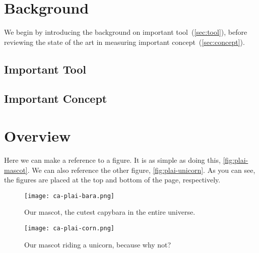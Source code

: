 \documentclass[thesis]{plai}
\begin{document}
\chapter{Background}
\label{chapter:background}

We begin by introducing the background on important tool~(\autoref{sec:tool}), before reviewing the state of the art in measuring important concept~(\autoref{sec:concept}).

\section{Important Tool}
\label{sec:tool}

\lipsum[2-4]

\section{Important Concept}
\label{sec:concept}

\lipsum[2-4]


\chapter{Overview}
\label{chapter:overview}

Here we can make a reference to a figure.
It is as simple as doing this, \autoref{fig:plai-mascot}.
We can also reference the other figure, \autoref{fig:plai-unicorn}.
As you can see, the figures are placed at the top and bottom of the page, respectively.

\lipsum[1-5]

\begin{figure}[t]
    \begin{center}
        \texttt{[image: ca-plai-bara.png]}
    \end{center}
    \caption{Our mascot, the cutest capybara in the entire universe.}
    \label{fig:plai-mascot}
\end{figure}

\begin{figure}[t]
    \begin{center}
        \texttt{[image: ca-plai-corn.png]}
    \end{center}
    \caption{Our mascot riding a unicorn, because why not?}
    \label{fig:plai-unicorn}
\end{figure}


\end{document}
